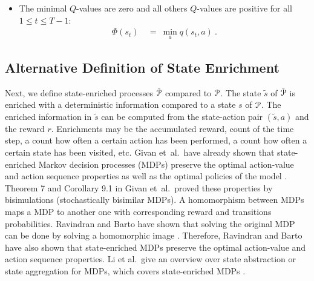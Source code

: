 \documentclass{article}
\renewcommand{\leq}{\leqslant}
\begin{document}
\begin{appendices}
\begin{itemize}
\item The minimal $Q$-values are zero and all others $Q$-values are positive
for all $1\leq t \leq T-1$:
\begin{align}
 \Phi(s_t)  \ &= \ \min_{a} q(s_t,a)  \ .
\end{align}
\end{itemize}




\subsection{Alternative Definition of State Enrichment}
\label{sec:AStateEnrich}
Next, we define state-enriched processes $\tilde{\mathcal{P}}$ compared to $\mathcal{P}$.
The state $\tilde{s}$ of $\tilde{\mathcal{P}}$ is enriched with a
deterministic information compared to a state $s$ of $\mathcal{P}$.
The enriched information
in $\tilde{s}$ can be computed from the state-action pair $(\tilde{s},a)$
and the reward $r$.
Enrichments may be the accumulated reward, count of the time step,
a count how often a certain action
has been performed, a count how often a certain state has been
visited, etc.
Givan et~al.\ have already shown that state-enriched Markov decision
processes (MDPs) preserve the optimal action-value and action sequence properties
as well as the optimal policies of the model \cite{Givan:03}.
Theorem 7 and Corollary 9.1 in Givan et~al.\ proved
these properties \cite{Givan:03} by bisimulations
(stochastically bisimilar MDPs).
A homomorphism between MDPs maps a MDP 
to another one with corresponding reward and transitions probabilities.
Ravindran and Barto have shown that solving the original MDP can be
done by solving a homomorphic image \cite{Ravindran:03}.
Therefore, Ravindran and Barto have also shown that 
state-enriched MDPs preserve the optimal action-value and action sequence properties.
Li et al.\ give an overview over state abstraction or state aggregation for
MDPs, which covers state-enriched MDPs \cite{Li:06}.



\end{appendices}
\end{document}
